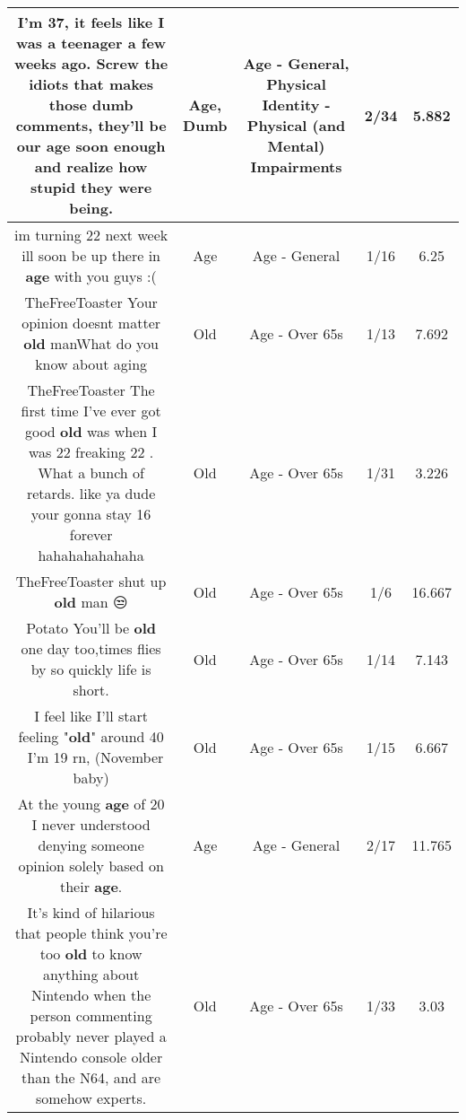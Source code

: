 \documentclass[11pt]{article}
\newlength\mylength
\begin{document}
\begin{center}
\begin{longtable}{|C{.65\mylength}|C{.30\mylength}|C{.12\mylength}|C{.12\mylength}|C{.12\mylength}|}
  \small I'm 37, it feels like I was a teenager a few weeks ago. Screw the idiots that makes those \textbf{dumb} comments, they'll be our \textbf{age} soon enough and realize how stupid they were being.\normalsize   & Age, Dumb & Age - General, Physical Identity - Physical (and Mental) Impairments & 2/34 & 5.882 \\  \hline
  \small im turning 22 next week ill soon be up there in \textbf{age} with you guys :(\normalsize   & Age & Age - General & 1/16 & 6.25 \\  \hline
  \small TheFreeToaster Your opinion doesnt matter \textbf{old} manWhat do you know about aging\normalsize   & Old & Age - Over 65s & 1/13 & 7.692 \\  \hline
  \small TheFreeToaster The first time I've ever got good \textbf{old} was when I was 22 freaking 22 . What a bunch of retards. like ya dude your gonna stay 16 forever hahahahahahaha\normalsize   & Old & Age - Over 65s & 1/31 & 3.226 \\  \hline
  \small TheFreeToaster shut up \textbf{old} man 😒\normalsize   & Old & Age - Over 65s & 1/6 & 16.667 \\  \hline
  \small Potato You'll be \textbf{old} one day too,times flies by so quickly life is short.\normalsize   & Old & Age - Over 65s & 1/14 & 7.143 \\  \hline
  \small I feel like I'll start feeling "\textbf{old}" around 40 🤔 I'm 19 rn, (November baby)\normalsize   & Old & Age - Over 65s & 1/15 & 6.667 \\  \hline
  \small At the young \textbf{age} of 20 I never understood denying someone opinion solely based on their \textbf{age}.\normalsize   & Age & Age - General & 2/17 & 11.765 \\  \hline
  \small It's kind of hilarious that people think you're too \textbf{old} to know anything about Nintendo when the person commenting probably never played a Nintendo console older than the N64, and are somehow experts.\normalsize   & Old & Age - Over 65s & 1/33 & 3.03 \\  \hline

\end{longtable}
\end{center}
\end{document}
